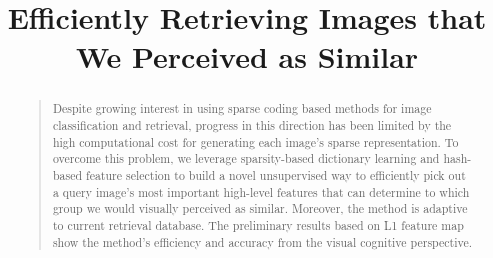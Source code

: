\documentclass[letterpaper]{article}
\begin{document}
\title{Efficiently Retrieving Images that We Perceived as Similar}
\maketitle
\begin{abstract}
\begin{quote}
Despite growing interest in using sparse coding based methods for image classification and retrieval, progress in this direction has been limited by the high computational cost for generating each image's sparse representation. To overcome this problem, we leverage sparsity-based dictionary learning and hash-based feature selection to build a novel unsupervised way to efficiently pick out a query image's most important high-level features that can determine to which group we would visually perceived as similar. Moreover, the method is adaptive to current retrieval database. The preliminary results based on L1 feature map show the method's efficiency and accuracy from the visual cognitive perspective. 
\end{quote}
\end{abstract}
\end{document}
